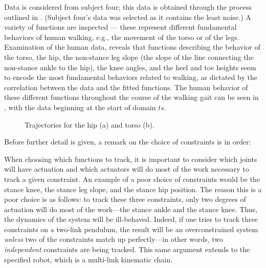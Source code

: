 Data is considered from subject four; this data is obtained through the process outlined in . (Subject four's data was selected as it contains the least noise.) A variety of functions are inspected --- these represent different fundamental behaviors of human walking, e.g., the movement of the torso or of the legs. Examination of the human data, reveals that functions describing the behavior of the torso, the hip, the non-stance leg slope (the slope of the line connecting the non-stance ankle to the hip), the knee angles, and the heel and toe heights seem to encode the most fundamental behaviors related to walking, as dictated by the correlation between the data and the fitted functions. The human behavior of these different functions throughout the course of the walking gait can be seen in , with the data beginning at the start of domain $ts$.

\begin{figure}[t]
  \centering
  \caption{Trajectories for the hip (a) and torso (b).}
  \label{fig:torso-hip}
\end{figure}

Before further detail is given, a remark on the choice of constraints is in order:
\begin{remark} \label{rmk:actuation}
  When choosing which functions to track, it is important to consider which joints will have actuation and which actuators will do most of the work necessary to track a given constraint. An example of a poor choice of constraints would be the stance knee, the stance leg slope, and the stance hip position. The reason this is a poor choice is as follows: to track these three constraints, only two degrees of actuation will do most of the work---the stance ankle and the stance knee. Thus, the dynamics of the system will be ill-behaved. Indeed, if one tries to track three constraints on a two-link pendulum, the result will be an overconstrained system {\em unless} two of the constraints match up perfectly---in other words, two {\em independent} constraints are being tracked. This same argument extends to the specified robot, which is a multi-link kinematic chain.
\end{remark}


